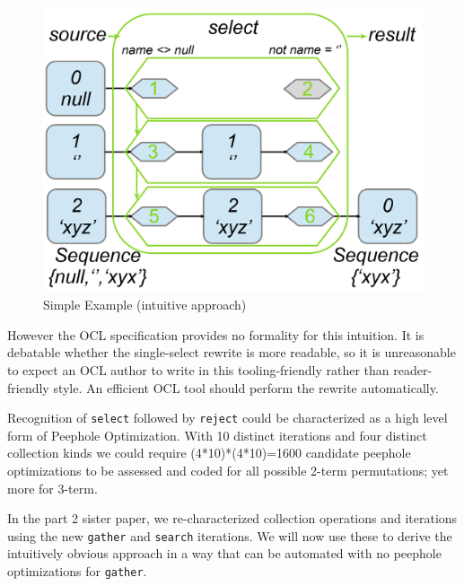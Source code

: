 \documentclass[
]{ceurart}
\begin{document}
\begin{figure}
	\vspace{-10pt}
	\begin{center}
		\includegraphics[width=6.0in]{ExampleIntuitive.png}
	\end{center}
	\vspace{-10pt}
	\caption{Simple Example (intuitive approach)}
	\label{fig:ExampleIntutive}
	\vspace{-10pt}
\end{figure}

However the OCL specification provides no formality for this intuition. It is debatable whether the single-select rewrite is more readable, so it is unreasonable to expect an OCL author to write in this tooling-friendly rather than reader-friendly style. An efficient OCL tool should perform the rewrite automatically.

Recognition of \verb!select! followed by \verb!reject! could be characterized as a high level form of Peephole Optimization. With 10 distinct iterations and four distinct collection kinds we could require (4*10)*(4*10)=1600 candidate peephole optimizations to be assessed and coded for all possible 2-term permutations; yet more for 3-term. 

In the part 2 sister paper, we re-characterized collection operations and iterations using the new \verb!gather! and \verb!search! iterations. We will now use these to derive the intuitively obvious approach in a way that can be automated with no peephole optimizations for \verb!gather!. 
\end{document}

